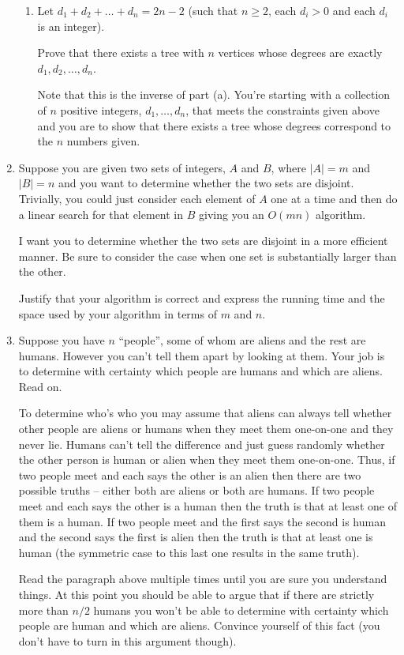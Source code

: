 \documentclass[11pt]{article}
\begin{document}
\begin{enumerate}[1.]
\begin{enumerate}
\item Let $d_1 + d_2 + \ldots + d_n = 2n - 2$ (such that $n \geq 2$, each $d_i > 0$ and each $d_i$ is an integer).  

Prove that there exists a tree with $n$ vertices whose degrees are exactly $d_1, d_2, \ldots, d_n$.

Note that this is the inverse of part (a).  You're starting with a collection of $n$ positive integers, $d_1, \ldots, d_n$, that meets the constraints given above and you are to show that there exists a tree whose degrees correspond to the $n$ numbers given.  
\end{enumerate}


\item  Suppose you are given two sets of integers, $A$ and $B$, where $|A| = m$ and $|B| = n$ and you want to determine whether the two sets are disjoint.  Trivially, you could just consider each element of $A$ one at a time and then do a linear search for that element in $B$ giving you an $O(mn)$ algorithm.  

I want you to determine whether the two sets are disjoint in a more efficient manner.  Be sure to consider the case when one set is substantially larger than the other. 

Justify that your algorithm is correct and express the running time and the space used by your algorithm in terms of $m$ and $n$. 


\item  Suppose you have $n$ ``people'', some of whom are aliens and the rest are humans.  However you can't tell them apart by looking at them.  Your job is to determine with certainty which people are humans and which are aliens.  Read on.   

To determine who's who you may assume that aliens can always tell whether other people are aliens or humans when they meet them one-on-one and they never lie.  Humans can't tell the difference and just guess randomly whether the other person is human or alien when they meet them one-on-one.  Thus, if two people meet and each says the other is an alien then there are two possible truths -- either both are aliens or both are humans.  If two people meet and each says the other is a human then the truth is that at least one of them is a human.  If two people meet and the first says the second is human and the second says the first is alien then the truth is that at least one is human (the symmetric case to this last one results in the same truth).  

Read the paragraph above multiple times until you are sure you understand things.  At this point you should be able to argue that if there are strictly more than $n/2$ humans you won't be able to determine with certainty which people are human and which are aliens.  Convince yourself of this fact (you don't have to turn in this argument though).  


\end{enumerate}
\end{document}
